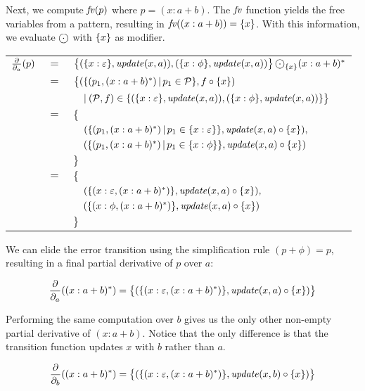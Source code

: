 \begin{eg}
   \newcommand\iteratex{\iterate{\{x\}}}

   Next, we compute $\mathit{fv}(p)$ where $p = (x:a+b)$. The $\mathit{fv}$ function yields the
   free variables from a pattern, resulting in $\mathit{fv}((x:a+b)) = \{ x \}$. With
   this information, we evaluate $\circledcdot$ with $\iteratex$ as modifier.

   \begin{tabular}{lll}
      $\frac{\partial}{\partial_{a}}(p)$
      & $=$ &
      $\big\{ (\{ x:\varepsilon \}, \updatexa), (\{ x:\phi \}, \updatexa) \big\} \circledcdot_{\iteratex} (x:a+b)^*$ \\
      & $=$ &
      $\big\{ (\{ (p_1, (x:a+b)^*) \where p_1 \in \pset \}, f \circ \iteratex)$ \\
      & &
      $\quad\operatorname{|}\: (\mathcal{P}, f) \in \{ (\{ x:\varepsilon \}, \mathit{update}(x, a)), (\{ x:\phi \}, \mathit{update}(x, a)) \} \big\}$ \\
      & $=$ &
      $\big\{$ \\
      & &
      $\quad (\{ (p_1, (x:a+b)^*) \where p_1 \in \{ x:\varepsilon \} \}, \updatexa \circ \iteratex),$ \\
      & &
      $\quad (\{ (p_1, (x:a+b)^*) \where p_1 \in \{ x:\phi \} \}, \updatexa \circ \iteratex)$ \\
      & &
      $\big\}$ \\
      & $=$ &
      $\big\{$ \\
      & &
      $\quad (\{ (x:\varepsilon, (x:a+b)^*) \}, \updatexa \circ \iteratex),$ \\
      & &
      $\quad (\{ (x:\phi, (x:a+b)^*) \}, \updatexa \circ \iteratex)$ \\
      & &
      $\big\}$ \\
   \end{tabular}

   We can elide the error transition using the simplification rule $(p+\phi) =
   p$, resulting in a final partial derivative of $p$ over $a$:

   \[
      \dda((x:a+b)^*) =
      \big\{ (\{ (x:\varepsilon, (x:a+b)^*) \}, \updatexa \circ \iteratex) \big\}
   \]

   Performing the same computation over $b$ gives us the only other non-empty
   partial derivative of $(x:a+b)$. Notice that the only difference is that the
   transition function updates $x$ with $b$ rather than $a$.

   \[
      \ddb((x:a+b)^*) =
      \big\{ (\{ (x:\varepsilon, (x:a+b)^*) \}, \updatexb \circ \iteratex) \big\}
   \]


\end{eg}
